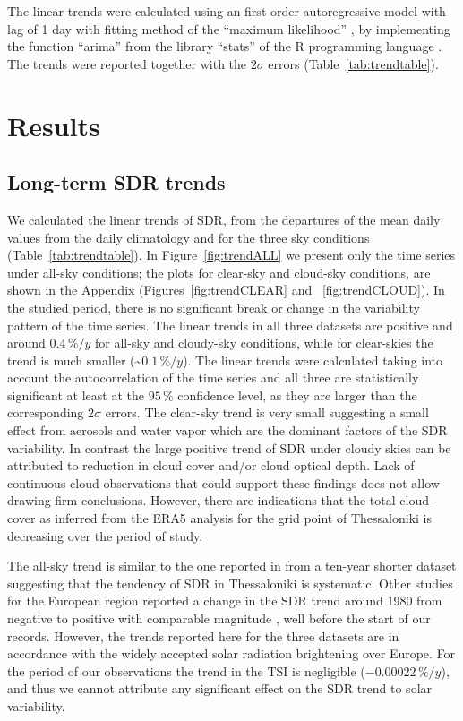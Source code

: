 \documentclass[applsci,article,submit,moreauthors,pdftex]{Definitions/mdpi}
\begin{document}
The linear trends were calculated using an first order autoregressive
model with lag of 1 day with fitting method of the ``maximum
likelihood'' \citep{Gardner1980, Jones1980}, by implementing the
function ``arima'' from the library ``stats'' of the R programming
language \citep{RCT2023}. The trends were reported together with the
\(2\sigma\) errors (Table~\ref{tab:trendtable}).

\hypertarget{results}{%
\section{Results}\label{results}}

\hypertarget{long-term-sdr-trends}{%
\subsection{Long-term SDR trends}\label{long-term-sdr-trends}}

We calculated the linear trends of SDR, from the departures of the mean
daily values from the daily climatology and for the three sky conditions
(Table~\ref{tab:trendtable}). In Figure~\ref{fig:trendALL} we present
only the time series under all-sky conditions; the plots for clear-sky
and cloud-sky conditions, are shown in the Appendix
(Figures~\ref{fig:trendCLEAR} and~ \ref{fig:trendCLOUD}). In the studied
period, there is no significant break or change in the variability
pattern of the time series. The linear trends in all three datasets are
positive and around \(0.4\,\%/y\) for all-sky and cloudy-sky conditions,
while for clear-skies the trend is much smaller
(\textasciitilde{}\(0.1\,\%/y\)). The linear trends were calculated
taking into account the autocorrelation of the time series and all three
are statistically significant at least at the \(95\,\%\) confidence
level, as they are larger than the corresponding \(2\sigma\) errors. The
clear-sky trend is very small suggesting a small effect from aerosols
and water vapor which are the dominant factors of the SDR variability.
In contrast the large positive trend of SDR under cloudy skies can be
attributed to reduction in cloud cover and/or cloud optical depth. Lack
of continuous cloud observations that could support these findings does
not allow drawing firm conclusions. However, there are indications that
the total cloud-cover as inferred from the ERA5 analysis for the grid
point of Thessaloniki is decreasing over the period of study.

The all-sky trend is similar to the one reported in \citet{Bais2013}
from a ten-year shorter dataset suggesting that the tendency of SDR in
Thessaloniki is systematic. Other studies for the European region
reported a change in the SDR trend around 1980 from negative to positive
with comparable magnitude \citep{Wild2021, Yuan2021, Ohmura2009}, well
before the start of our records. However, the trends reported here for
the three datasets are in accordance with the widely accepted solar
radiation brightening over Europe. For the period of our observations
the trend in the TSI is negligible (\(-0.00022\,\%/y\)), and thus we
cannot attribute any significant effect on the SDR trend to solar
variability.
\end{document}

